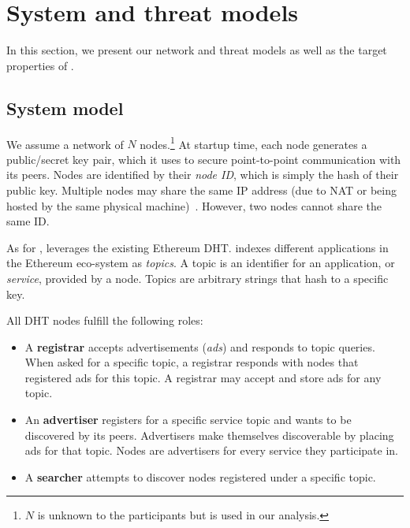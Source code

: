 
\section{System and threat models}
\label{sec:model}

In this section, we present our network and threat models as well as the target properties of \sysname. 

\subsection{System model}

We assume a network of $N$ nodes.\footnote{$N$ is unknown to the participants but is used in our analysis.}
At startup time, each node generates a public/secret key pair, which it uses to secure point-to-point communication with its peers.
Nodes are identified by their \emph{node ID}, which is simply the hash of their public key.
Multiple nodes may share the same IP address (due to NAT or being hosted by the same physical machine)~\cite{marcus2018low}. However, two nodes cannot share the same ID.


As for \discv, \sysname leverages the existing Ethereum DHT.
\sysname indexes different applications in the Ethereum eco-system as \emph{topics}.
A topic is an identifier for an application, or \emph{service}, provided by a node.
Topics are arbitrary strings that hash to a specific key. %

All DHT nodes fulfill the following roles:
\begin{itemize}
    \item A \textbf{registrar} accepts advertisements (\emph{ads}) and responds to topic queries. 
    When asked for a specific topic, a registrar responds with nodes that registered ads for this topic.
    A registrar may accept and store ads for any topic.
    \item An \textbf{advertiser} registers for a specific service topic and wants to be discovered by its peers.
    Advertisers make themselves discoverable by placing ads for that topic.
    Nodes are advertisers for every service they participate in.
    \item A \textbf{searcher} attempts to discover nodes registered under a specific topic.
\end{itemize}


